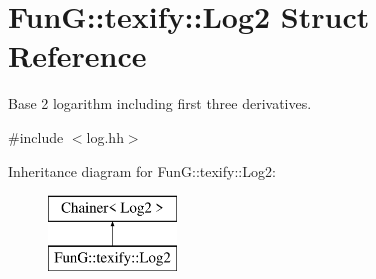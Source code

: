 \hypertarget{structFunG_1_1texify_1_1Log2}{\section{Fun\-G\-:\-:texify\-:\-:Log2 Struct Reference}
\label{structFunG_1_1texify_1_1Log2}
}


Base 2 logarithm including first three derivatives.  




{\ttfamily \#include $<$log.\-hh$>$}

Inheritance diagram for Fun\-G\-:\-:texify\-:\-:Log2\-:\begin{figure}[H]
\begin{center}
\leavevmode
\includegraphics[height=2.000000cm]{structFunG_1_1texify_1_1Log2}
\end{center}
\end{figure}

